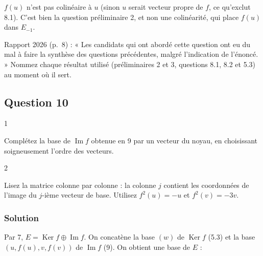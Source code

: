 \documentclass[11pt,a4paper]{article}
\newcommand{\equationajustee}[1]{%
  \sbox{\boiteequation}{$\displaystyle #1$}%
  \ifdim\wd\boiteequation>\linewidth
    \[\resizebox{\linewidth}{!}{\usebox{\boiteequation}}\]%
  \else
    \[#1\]%
  \fi}
\begin{document}
\begin{piege}

\(f(u)\) n'est pas colinéaire à \(u\) (sinon \(u\) serait vecteur propre de \(f\), ce qu'exclut 8.1). C'est bien la question préliminaire 2, et non une colinéarité, qui place \(f(u)\) dans \(E_{-1}\).

\end{piege}

\begin{jury}

Rapport 2026 (p.~8) : « Les candidats qui ont abordé cette question ont eu du mal à faire la synthèse des questions précédentes, malgré l'indication de l'énoncé. » Nommez chaque résultat utilisé (préliminaires 2 et 3, questions 8.1, 8.2 et 5.3) au moment où il sert.

\end{jury}

\hypertarget{question-10}{%
\subsection{Question 10}\label{question-10}}

\begin{indication}{1}

Complétez la base de \(\operatorname{Im}f\) obtenue en 9 par un vecteur du noyau, en choisissant soigneusement l'ordre des vecteurs.

\end{indication}

\begin{indication}{2}

Lisez la matrice colonne par colonne : la colonne \(j\) contient les coordonnées de l'image du \(j\)-ième vecteur de base. Utilisez \(f^2(u)=-u\) et \(f^2(v)=-3v\).

\end{indication}

\hypertarget{solution-17}{%
\subsubsection{Solution}\label{solution-17}}

Par 7, \(E=\operatorname{Ker}f\oplus\operatorname{Im}f\). On concatène la base \((w)\) de \(\operatorname{Ker}f\) (5.3) et la base \((u,f(u),v,f(v))\) de \(\operatorname{Im}f\) (9). On obtient une base de \(E\) :

\equationajustee{\mathscr B'=(w,\ u,\ f(u),\ v,\ f(v)).}
\end{document}
